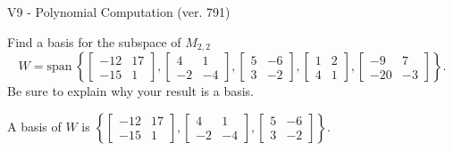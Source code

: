 \begin{exercise}
  \begin{exerciseTitle}V9 - Polynomial Computation (ver. 791)\end{exerciseTitle}
  \begin{exerciseStatement}
    Find a basis for the subspace of \(M_{2,2}\) 
\[W=\mathrm{span}\ \left\{\left[\begin{array}{cc}
-12 & 17 \\
-15 & 1
\end{array}\right] , \left[\begin{array}{cc}
4 & 1 \\
-2 & -4
\end{array}\right] , \left[\begin{array}{cc}
5 & -6 \\
3 & -2
\end{array}\right] , \left[\begin{array}{cc}
1 & 2 \\
4 & 1
\end{array}\right] , \left[\begin{array}{cc}
-9 & 7 \\
-20 & -3
\end{array}\right]\right\}.\]
 Be sure to explain why your result is a basis.


  \end{exerciseStatement}
  \begin{exerciseAnswer}
   A basis of \(W\) is  \(\left\{\left[\begin{array}{cc}
-12 & 17 \\
-15 & 1
\end{array}\right] , \left[\begin{array}{cc}
4 & 1 \\
-2 & -4
\end{array}\right] , \left[\begin{array}{cc}
5 & -6 \\
3 & -2
\end{array}\right]\right\}\).
  


  \end{exerciseAnswer}
\end{exercise}